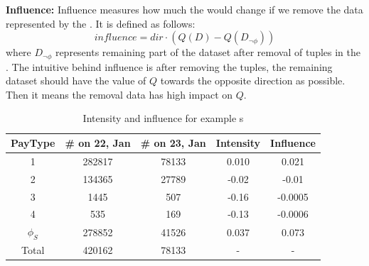 \textbf{Influence:}
Influence measures how much the {\fact} would change if we remove the data represented by the {\explanation}. 
It is defined as follows:
$$influence = dir \cdot (Q (D) - Q(D_{\neg \phi})) $$
where $D_{\neg \phi}$ represents remaining part of the dataset after removal of tuples in the {\explanation}. The intuitive behind influence is after removing the {\explanation} tuples, the remaining dataset should have the value of $Q$ towards the opposite direction as possible. Then it means the removal data has high impact on $Q$. 

\begin{table}
	\centering
	\caption{Intensity and influence for example {\explanation}s}
	\begin{tabular}{|c|c|c|c|c|}
		\hline
		PayType & \# on 22, Jan & \# on 23, Jan & Intensity & Influence\\ \hline
		1 & 282817 & 78133 & 0.010& 0.021\\ \hline
		2 & 134365 & 27789  & -0.02& -0.01\\ \hline
		3 & 1445 & 507  & -0.16& -0.0005\\ \hline
		4 & 535 & 169  & -0.13& -0.0006\\ \hline
		$\phi_S$ & 278852 &  41526 & 0.037 & 0.073\\ \hline
		Total	& 420162 & 78133 &- & - \\ \hline			
	\end{tabular}
	\label{table:intensity_influence_example}
\end{table}


